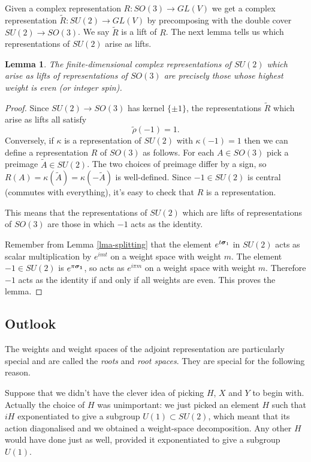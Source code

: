 \documentclass[12pt]{article}
\renewcommand\vec[1]{\ensuremath\boldsymbol{#1}}
\newtheorem{lma}[thm]{Lemma}
\theoremstyle{definition}
\theoremstyle{check}
\theoremstyle{remark}
\theoremstyle{TheoremNum}
\begin{document}
Given a complex representation $R\colon SO(3)\to GL(V)$ we get a complex representation $\tilde{R}\colon SU(2)\to GL(V)$ by precomposing with the double cover $SU(2)\to SO(3)$. We say $\tilde{R}$ is a lift of $R$. The next lemma tells us which representations of $SU(2)$ arise as lifts.
\begin{lma}\label{lma-so3-rep}
The finite-dimensional complex representations of $SU(2)$ which arise as lifts of representations of $SO(3)$ are precisely those whose highest weight is even (or integer spin).
\end{lma}
\begin{proof}
Since $SU(2)\to SO(3)$ has kernel $\{\pm 1\}$, the representations $\tilde{R}$ which arise as lifts all satisfy
\[\tilde{\rho}(-1)=1.\]
Conversely, if $\kappa$ is a representation of $SU(2)$ with $\kappa(-1)=1$ then we can define a representation $R$ of $SO(3)$ as follows. For each $A\in SO(3)$ pick a preimage $\tilde{A}\in SU(2)$. The two choices of preimage differ by a sign, so $R(A)=\kappa(\tilde{A})=\kappa(-\tilde{A})$ is well-defined. Since $-1\in SU(2)$ is central (commutes with everything), it's easy to check that $R$ is a representation.

This means that the representations of $SU(2)$ which are lifts of representations of $SO(3)$ are those in which $-1$ acts as the identity.

Remember from Lemma \ref{lma-splitting} that the element $e^{t\vec{\sigma}_1}$ in $SU(2)$ acts as scalar multiplication by $e^{imt}$ on a weight space with weight $m$. The element $-1\in SU(2)$ is $e^{\pi\vec{\sigma_1}}$, so acts as $e^{i\pi m}$ on a weight space with weight $m$. Therefore $-1$ acts as the identity if and only if all weights are even. This proves the lemma.
\end{proof}

\subsection{Outlook}

The weights and weight spaces of the adjoint representation are particularly special and are called the {\em roots} and {\em root spaces}. They are special for the following reason.

Suppose that we didn't have the clever idea of picking $H$, $X$ and $Y$ to begin with. Actually the choice of $H$ was unimportant: we just picked an element $H$ such that $iH$ exponentiated to give a subgroup $U(1)\subset SU(2)$, which meant that its action diagonalised and we obtained a weight-space decomposition. Any other $H$ would have done just as well, provided it exponentiated to give a subgroup $U(1)$.
\end{document}
